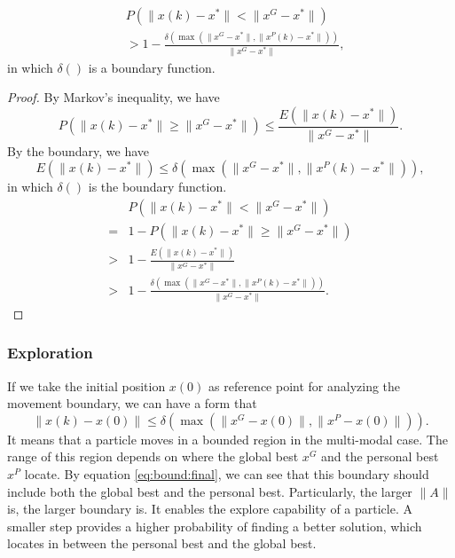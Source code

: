 \begin{mycoro}
\label{lem:nonsingleHill:particle:prob}
\begin{equation}
\begin{aligned}
& P( \lVert x(k) - x^{*} \rVert < \lVert x^{G} - x^{*} \rVert ) \\
& > 1 - \frac{ \delta ( \max ( \lVert x^{G} - x^{*} \rVert , \lVert x^{P}(k) - x^{*}  \rVert ) ) }{ \lVert x^{G} - x^{*} \rVert },
\end{aligned}
\end{equation}
in which $ \delta () $ is a boundary function.
\begin{proof}
By Markov's inequality, we have
\begin{equation}
P( \lVert x(k) - x^{*} \rVert \geq \lVert x^{G} - x^{*} \rVert ) \leq \frac{ E( \lVert x(k) - x^{*} \rVert ) }{ \lVert x^{G} - x^{*} \rVert }.
\end{equation} 
By the boundary, we have
\begin{equation}
E( \lVert x(k) - x^{*} \rVert ) \leq \delta ( \max ( \lVert x^{G} - x^{*} \rVert , \lVert x^{P}(k) - x^{*}  \rVert ) ),
\end{equation}
in which $ \delta () $ is the boundary function.
\begin{equation}
\begin{aligned}
& P( \lVert x(k) - x^{*} \rVert < \lVert x^{G} - x^{*} \rVert ) \\
= & 1 - P( \lVert x(k) - x^{*} \rVert \geq \lVert x^{G} - x^{*} \rVert ) \\
> & 1 - \frac{ E( \lVert x(k) - x^{*} \rVert ) }{ \lVert x^{G} - x^{*} \rVert } \\
> & 1 - \frac{ \delta ( \max ( \lVert x^{G} - x^{*} \rVert , \lVert x^{P}(k) - x^{*}  \rVert ) ) }{ \lVert x^{G} - x^{*} \rVert }.
\end{aligned}
\end{equation}
\end{proof}
\end{mycoro}

\subsubsection{Exploration}

If we take the initial position $ x(0) $ as reference point for analyzing the movement boundary, we can have a form that 
\begin{equation}
\lVert x(k) - x(0) \rVert \leq \delta ( \max ( \lVert x^{G} - x(0) \rVert , \lVert x^{P} - x(0) \rVert ) ).
\end{equation}
It means that a particle moves in a bounded region in the multi-modal case.
The range of this region depends on where the global best $ x^{G} $ and the personal best $ x^{P} $ locate.
By equation \eqref{eq:bound:final}, we can see that this boundary should include both the global best and the personal best.
Particularly, the larger $ \lVert A \rVert $ is, the larger boundary is.
It enables the explore capability of a particle.
A smaller step provides a higher probability of finding a better solution, which locates in between the personal best and the global best.

